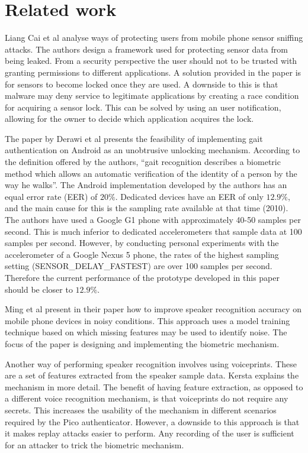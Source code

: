\section{Related work}
Liang Cai et al \cite{cai2009defending} analyse ways of protecting users from mobile phone sensor sniffing attacks. The authors design a framework used for protecting sensor data from being leaked. From a security perspective the user should not to be trusted with granting permissions to different applications. A solution provided in the paper is for sensors to become locked once they are used. A downside to this is that malware may deny service to legitimate applications by creating a race condition for acquiring a sensor lock. This can be solved by using an user notification, allowing for the owner to decide which application acquires the lock.

The paper by Derawi et al \cite{derawi2010unobtrusive} presents the feasibility of implementing gait authentication on Android as an unobtrusive unlocking mechanism. According to the definition offered by the authors, ``gait recognition describes a biometric method which allows an automatic verification of the identity of a person by the way he walks''. The Android implementation developed by the authors has an equal error rate (EER) of $20\%$. Dedicated devices have an EER of only $12.9\%$, and the main cause for this is the sampling rate available at that time (2010). The authors have used a Google G1 phone with approximately 40-50 samples per second. This is much inferior to dedicated accelerometers that sample data at 100 samples per second. However, by conducting personal experiments with the accelerometer of a Google Nexus 5 phone, the rates of the highest sampling setting (SENSOR\_DELAY\_FASTEST) are over 100 samples per second. Therefore the current performance of the prototype developed in this paper should be closer to $12.9\%$.

Ming et al \cite{ming2007robust} present in their paper how to improve speaker recognition accuracy on mobile phone devices in noisy conditions. This approach uses a model training technique based on which missing features may be used to identify noise. The focus of the paper is designing and implementing the biometric mechanism.

Another way of performing speaker recognition involves using voiceprints. These are a set of features extracted from the speaker sample data. Kersta \cite{kersta2005voiceprint} explains the mechanism in more detail. The benefit of having feature extraction, as opposed to a different voice recognition mechanism, is that voiceprints do not require any secrets. This increases the usability of the mechanism in different scenarios required by the Pico authenticator. However, a downside to this approach is that it makes replay attacks easier to perform. Any recording of the user is sufficient for an attacker to trick the biometric mechanism.

